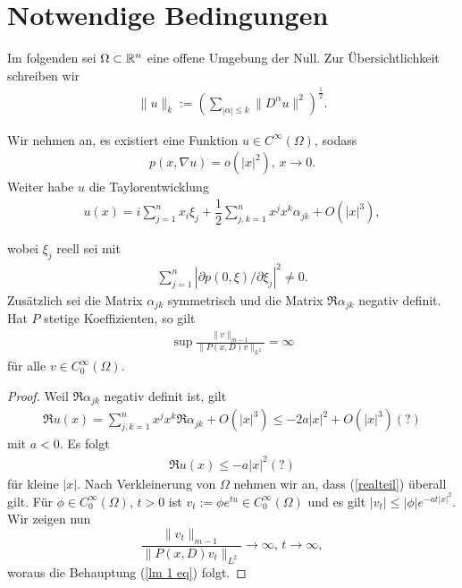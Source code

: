\section{Notwendige Bedingungen}
Im folgenden sei $\Omega \subset \mathbb R^n$ eine offene Umgebung der Null. Zur Übersichtlichkeit schreiben wir
\begin{align*}
\lVert u \rVert_k := \left( \sum_{|\alpha| \le k} \lVert D^\alpha u \rVert^2 \right)^{\frac{1}{2}}.
\end{align*}
\begin{lem}
Wir nehmen an, es existiert eine Funktion $u \in C^\infty (\Omega)$, sodass 
\begin{align}
\label{grad}
p(x, \nabla u) = o \left(|x|^2\right), \, x \rightarrow 0.
\end{align}
Weiter habe $u$ die Taylorentwicklung \begin{align}
	\label{taylor}
u(x) = i \sum_{j=1}^{n} x_i \xi_j + \dfrac{1}{2} \sum_{j,k=1}^{n} x^j x^k \alpha_{jk} + O\left( |x|^3 \right),
\end{align}

wobei $\xi_j$ reell sei mit 
\begin{align}
\label{normpart}
\sum_{j=1}^{n}|\partial p(0,\xi)/\partial \xi_j|^2 \neq 0.
\end{align}
Zusätzlich sei die Matrix $\alpha_{jk}$ symmetrisch und die Matrix $\Re \alpha_{jk}$ negativ definit. Hat $P$ stetige Koeffizienten, so gilt
\begin{align}
\label{lm 1 eq}
\sup \frac{ \lVert v \rVert_{m-1} }{ \lVert P(x,D)v \rVert_{L^2}} = \infty
\end{align}
für alle $v \in C_0^\infty(\Omega)$.
\end{lem}
\begin{proof}
Weil $\Re \alpha_{jk}$ negativ definit ist, gilt\begin{align*}
\Re u(x) = \sum_{j,k=1}^{n} x^jx^k \Re \alpha_{jk} + O\left( |x|^3 \right) \le -2a |x|^2 + O\left( |x|^3 \right) (?)
\end{align*}
mit $a<0$. Es folgt
\begin{align}
\label{realteil}
\Re u(x) \le -a |x|^2 (?)
\end{align}
für kleine $|x|$. Nach Verkleinerung von $\Omega$ nehmen wir an, dass (\ref{realteil}) überall gilt. Für $\phi \in C_0^\infty(\Omega)$, $t>0$ ist $v_t := \phi e^{tu} \in C_0^\infty(\Omega)$ und es gilt $|v_t| \le |\phi| e^{-at|x|^2}$. Wir zeigen nun
\[
\frac{\lVert v_t \rVert_{m-1}}{\lVert P(x,D)v_t \rVert_{L^2}} \rightarrow \infty, \, t \rightarrow \infty,
\]
woraus die Behauptung (\ref{lm 1 eq}) folgt.
\end{proof}

